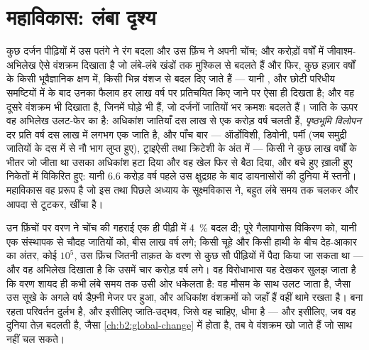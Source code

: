 \section{महाविकास: लंबा दृश्य}

\begin{proposition}[गति और प्रकार]\label{prop:b2:speciation:tempo}
कुछ दर्जन पीढ़ियों में उस पतंगे ने रंग बदला और उस फ़िंच ने
अपनी चोंच; और करोड़ों वर्षों में जीवाश्म-अभिलेख ऐसे वंशक्रम दिखाता है
जो लंबे-लंबे खंडों तक मुश्किल से बदलते हैं और फिर, कुछ हज़ार वर्षों के किसी
भूवैज्ञानिक क्षण में, किसी भिन्न वंशज से बदल दिए जाते हैं
--- यानी \emph{}, और छोटी परिधीय समष्टियों में
 के बाद उनका फैलाव हर लाख वर्ष पर
प्रतिचयित किए जाने पर ऐसा ही दिखता है;
और वह दूसरे वंशक्रम भी दिखाता है, जिनमें घोड़े भी हैं, जो दर्जनों जातियों भर
क्रमशः बदलते हैं। जाति के ऊपर वह अभिलेख
उलट-फेर का है: अधिकांश जातियाँ दस लाख से एक करोड़ वर्ष चलती हैं,
\emph{पृष्ठभूमि विलोपन} दर प्रति वर्ष दस लाख में लगभग एक
जाति है, और पाँच बार --- ऑर्डोविशी, डिवोनी, पर्मी (जब
समुद्री जातियों के दस में से नौ भाग लुप्त हुए), ट्राइऐसी तथा क्रिटेशी के अंत में ---
किसी \emph{} ने कुछ लाख वर्षों के भीतर जो जीता था उसका अधिकांश
हटा दिया और वह खेल फिर से बैठा दिया, और बचे हुए
ख़ाली हुए निकेतों में विकिरित हुए: यानी 6.6 करोड़ वर्ष पहले उस क्षुद्रग्रह के बाद
डायनासोरों की दुनिया में स्तनी। महाविकास वह प्ररूप है जो इस तथा
पिछले अध्याय के सूक्ष्मविकास ने, बहुत लंबे समय तक चलकर और
आपदा से टूटकर, खींचा है।
\end{proposition}

\begin{example}[दरों की तुलना]\label{ex:b2:speciation:rates}
उन फ़िंचों पर वरण ने चोंच की गहराई एक ही पीढ़ी में \qty{4}{\%} बदल दी;
पूरे गैलापागोस विकिरण को, यानी एक संस्थापक से चौदह जातियों को,
बीस लाख वर्ष लगे; किसी चूहे और किसी हाथी के बीच
देह-आकार का अंतर, कोई $10^{5}$, उस फ़िंच जितनी ताक़त के वरण से
कुछ सौ पीढ़ियों में पैदा किया जा सकता था ---
और वह अभिलेख दिखाता है कि उसमें चार करोड़ वर्ष लगे। वह विरोधाभास
यह देखकर सुलझ जाता है कि वरण शायद ही कभी लंबे समय तक उसी ओर धकेलता है:
वह मौसम के साथ उलट जाता है, जैसा उस सूखे के अगले वर्ष डैफ़्नी मेजर पर
हुआ, और  अधिकांश वंशक्रमों को
जहाँ हैं वहीं थामे रखता है। बना रहता परिवर्तन दुर्लभ है, और इसीलिए
जाति-उद्भव, जिसे वह चाहिए, धीमा है --- और इसीलिए, जब वह दुनिया
तेज़ बदलती है, जैसा \cref{ch:b2:global-change} में होता है, तब वे
वंशक्रम खो जाते हैं जो साथ नहीं चल सकते।
\end{example}

